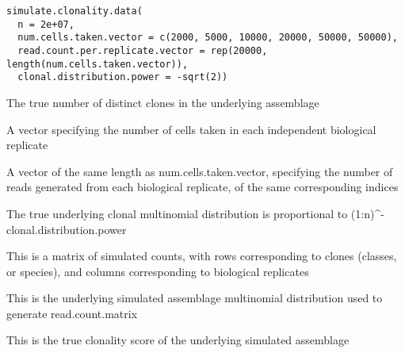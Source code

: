\documentclass[letterpaper]{book}
\begin{document}
%
\begin{Usage}
\begin{verbatim}
simulate.clonality.data(
  n = 2e+07, 
  num.cells.taken.vector = c(2000, 5000, 10000, 20000, 50000, 50000), 
  read.count.per.replicate.vector = rep(20000, length(num.cells.taken.vector)), 
  clonal.distribution.power = -sqrt(2))
\end{verbatim}
\end{Usage}
%
\begin{Arguments}
\begin{ldescription}
\item[\code{n}] 
The true number of distinct clones in the underlying assemblage

\item[\code{num.cells.taken.vector}] 
A vector specifying the number of cells taken in each independent biological replicate

\item[\code{read.count.per.replicate.vector}] 
A vector of the same length as num.cells.taken.vector, specifying the number of reads generated from each biological replicate, of the same corresponding indices

\item[\code{clonal.distribution.power}] 
The true underlying clonal multinomial distribution is proportional to (1:n)\textasciicircum{}-clonal.distribution.power

\end{ldescription}
\end{Arguments}
%
\begin{Value}





\begin{ldescription}
\item[\code{read.count.matrix}] This is a matrix of simulated counts, with rows corresponding to clones (classes, or species), and columns corresponding to biological replicates
\item[\code{true.clone.prob}] This is the underlying simulated assemblage multinomial distribution used to generate read.count.matrix
\item[\code{true.clonality}] This is the true clonality score of the underlying simulated assemblage
\end{ldescription}
\end{Value}
%
\begin{Examples}
\end{Examples}
\printindex{}
\end{document}
